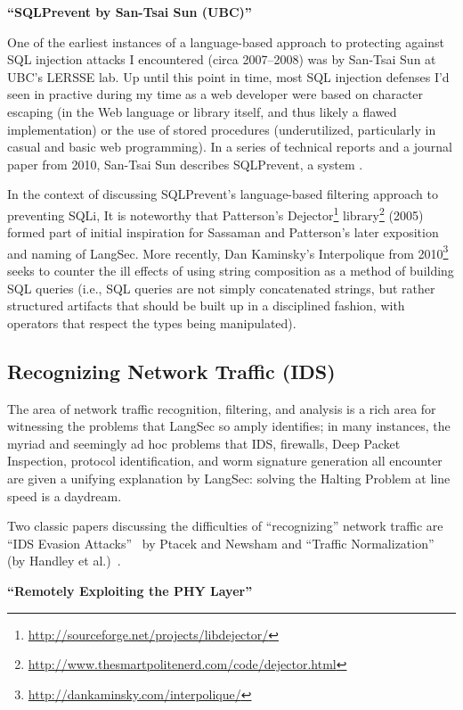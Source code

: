 \documentclass[acmcompsurv,acmnow]{acmtrans2m}
\begin{document}
{\bf ``SQLPrevent by San-Tsai Sun (UBC)''}

One of the earliest instances of a language-based approach to
protecting against SQL injection attacks I encountered (circa
2007--2008) was by San-Tsai Sun at UBC's LERSSE lab.  Up until this
point in time, most SQL injection defenses I'd seen in practive during
my time as a web developer were based on character escaping (in the
Web language or library itself, and thus likely a flawed
implementation) or the use of stored procedures (underutilized,
particularly in casual and basic web programming).  In a series of
technical reports and a journal paper from 2010\cite{XXX}, San-Tsai
Sun describes SQLPrevent, a system .

In the context of discussing SQLPrevent's language-based filtering
approach to preventing SQLi, It is noteworthy that Patterson's
Dejector\footnote{\url{http://sourceforge.net/projects/libdejector/}}
library\footnote{\url{http://www.thesmartpolitenerd.com/code/dejector.html}}
(2005) formed part of initial inspiration for Sassaman and Patterson's
later exposition and naming of LangSec. More recently, Dan Kaminsky's
Interpolique from
2010\footnote{\url{http://dankaminsky.com/interpolique/}} seeks to
counter the ill effects of using string composition as a method of
building SQL queries (i.e., SQL queries are not simply concatenated
strings, but rather structured artifacts that should be built up in a
disciplined fashion, with operators that respect the types being
manipulated).

\subsection{Recognizing Network Traffic (IDS)}

The area of network traffic recognition, filtering, and analysis is a
rich area for witnessing the problems that LangSec so amply
identifies; in many instances, the myriad and seemingly ad hoc
problems that IDS, firewalls, Deep Packet Inspection, protocol
identification, and worm signature generation all encounter are given
a unifying explanation by LangSec: solving the Halting Problem at line
speed is a daydream.

Two classic papers discussing the difficulties of ``recognizing''
network traffic are ``IDS Evasion Attacks''~\cite{XXX} by Ptacek and
Newsham and ``Traffic Normalization'' (by Handley et al.)~\cite{XXX}.


{\bf ``Remotely Exploiting the PHY Layer''}
\end{document}
